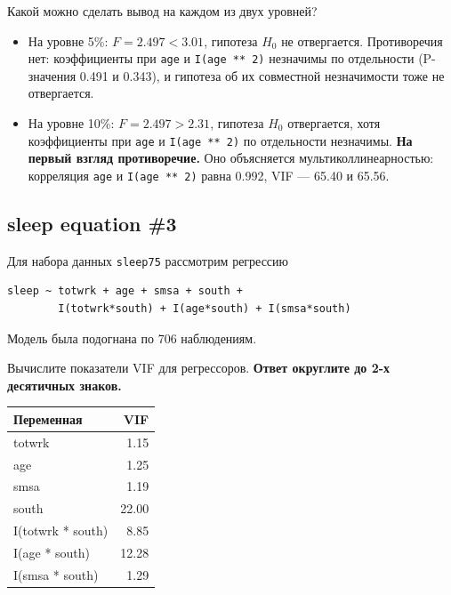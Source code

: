 \documentclass[
  russian,
]{article}
\newcounter{none} %
\providecommand{\tightlist}{%
  \setlength{\itemsep}{0pt}\setlength{\parskip}{0pt}}
\begin{document}
Какой можно сделать вывод на каждом из двух уровней?

\begin{tcolorbox}[enhanced jigsaw, arc=.35mm, bottomrule=.15mm, bottomtitle=1mm, breakable, colback=white, colbacktitle=quarto-callout-tip-color!10!white, colframe=quarto-callout-tip-color-frame, coltitle=black, left=2mm, leftrule=.75mm, opacityback=0, opacitybacktitle=0.6, rightrule=.15mm, title=\textcolor{quarto-callout-tip-color}{\faLightbulb}\hspace{0.5em}{Вывод}, titlerule=0mm, toprule=.15mm, toptitle=1mm]

\begin{itemize}
\tightlist
\item
  На уровне 5\%: \(F = 2.497 < 3.01\), гипотеза \(H_0\) не отвергается.
  Противоречия нет: коэффициенты при \texttt{age} и
  \texttt{I(age\ **\ 2)} незначимы по отдельности (P-значения 0.491 и
  0.343), и гипотеза об их совместной незначимости тоже не отвергается.
\item
  На уровне 10\%: \(F = 2.497 > 2.31\), гипотеза \(H_0\) отвергается,
  хотя коэффициенты при \texttt{age} и \texttt{I(age\ **\ 2)} по
  отдельности незначимы. \textbf{На первый взгляд противоречие.} Оно
  объясняется мультиколлинеарностью: корреляция \texttt{age} и
  \texttt{I(age\ **\ 2)} равна 0.992, VIF --- 65.40 и 65.56.
\end{itemize}

\end{tcolorbox}

\subsection{sleep equation \#3}\label{sleep-equation-3}

Для набора данных \texttt{sleep75} рассмотрим регрессию

\begin{verbatim}
sleep ~ totwrk + age + smsa + south +
        I(totwrk*south) + I(age*south) + I(smsa*south)
\end{verbatim}

Модель была подогнана по 706 наблюдениям.

Вычислите показатели VIF для регрессоров. \textbf{Ответ округлите до 2-х
десятичных знаков.}

{\def\LTcaptype{none} %
\begin{longtable}[]{@{}lr@{}}
\toprule\noalign{}
Переменная & VIF \\
\midrule\noalign{}
\endhead
\bottomrule\noalign{}
\endlastfoot
totwrk & 1.15 \\
age & 1.25 \\
smsa & 1.19 \\
south & 22.00 \\
I(totwrk * south) & 8.85 \\
I(age * south) & 12.28 \\
I(smsa * south) & 1.29 \\
\end{longtable}
}
\end{document}
